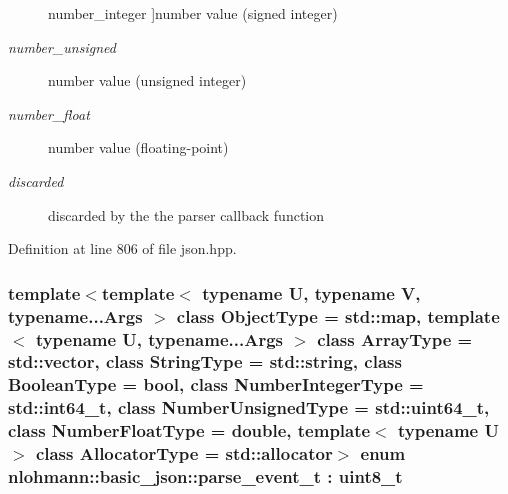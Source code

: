 \begin{Desc}
\begin{description}
{\hypertarget{classnlohmann_1_1basic__json_a231b02148577b69a154b2ce2c87a5522a5763da164f8659d94a56e29df64b4bcc}{}number\+\_\+integer\label{classnlohmann_1_1basic__json_a231b02148577b69a154b2ce2c87a5522a5763da164f8659d94a56e29df64b4bcc}
}]number value (signed integer) \item[{\em 
\hypertarget{classnlohmann_1_1basic__json_a231b02148577b69a154b2ce2c87a5522adce7cc8ec29055c4158828921f2f265e}{}number\+\_\+unsigned\label{classnlohmann_1_1basic__json_a231b02148577b69a154b2ce2c87a5522adce7cc8ec29055c4158828921f2f265e}
}]number value (unsigned integer) \item[{\em 
\hypertarget{classnlohmann_1_1basic__json_a231b02148577b69a154b2ce2c87a5522ad9966ecb59667235a57b4b999a649eef}{}number\+\_\+float\label{classnlohmann_1_1basic__json_a231b02148577b69a154b2ce2c87a5522ad9966ecb59667235a57b4b999a649eef}
}]number value (floating-\/point) \item[{\em 
\hypertarget{classnlohmann_1_1basic__json_a231b02148577b69a154b2ce2c87a5522a94708897ec9db8647dfe695714c98e46}{}discarded\label{classnlohmann_1_1basic__json_a231b02148577b69a154b2ce2c87a5522a94708897ec9db8647dfe695714c98e46}
}]discarded by the the parser callback function \end{description}
\end{Desc}


Definition at line 806 of file json.\+hpp.

\hypertarget{classnlohmann_1_1basic__json_aea1c863b719b4ca5b77188c171bbfafe}{}
\subsubsection[{parse\+\_\+event\+\_\+t}]{\setlength{\rightskip}{0pt plus 5cm}template$<$template$<$ typename U, typename V, typename...\+Args $>$ class Object\+Type = std\+::map, template$<$ typename U, typename...\+Args $>$ class Array\+Type = std\+::vector, class String\+Type  = std\+::string, class Boolean\+Type  = bool, class Number\+Integer\+Type  = std\+::int64\+\_\+t, class Number\+Unsigned\+Type  = std\+::uint64\+\_\+t, class Number\+Float\+Type  = double, template$<$ typename U $>$ class Allocator\+Type = std\+::allocator$>$ enum {\bf nlohmann\+::basic\+\_\+json\+::parse\+\_\+event\+\_\+t} \+: uint8\+\_\+t\hspace{0.3cm}{\ttfamily [strong]}}\label{classnlohmann_1_1basic__json_aea1c863b719b4ca5b77188c171bbfafe}


